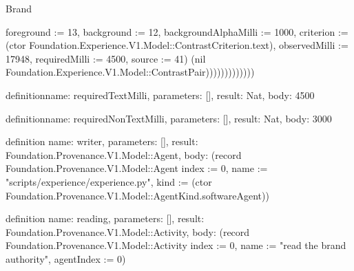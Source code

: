 \begin{lexlean}{Brand}
\begin{semanticmodule}
{{foreground := 13, background := 12, backgroundAlphaMilli := 1000, criterion := (ctor Foundation.Experience.V1.Model::ContrastCriterion.text), observedMilli := 17948, requiredMilli := 4500, source := 41}) (nil Foundation.Experience.V1.Model::ContrastPair)))))))))))))
}

definition{name: requiredTextMilli, parameters: [], result: Nat, body: 4500}

definition{name: requiredNonTextMilli, parameters: [], result: Nat, body: 3000}

definition{
  name: writer,
  parameters: [],
  result: Foundation.Provenance.V1.Model::Agent,
  body: (record Foundation.Provenance.V1.Model::Agent {index := 0, name := "scripts/experience/experience.py", kind := (ctor Foundation.Provenance.V1.Model::AgentKind.softwareAgent)})
}

definition{
  name: reading,
  parameters: [],
  result: Foundation.Provenance.V1.Model::Activity,
  body: (record Foundation.Provenance.V1.Model::Activity {index := 0, name := "read the brand authority", agentIndex := 0})
}


\end{semanticmodule}
\end{lexlean}
